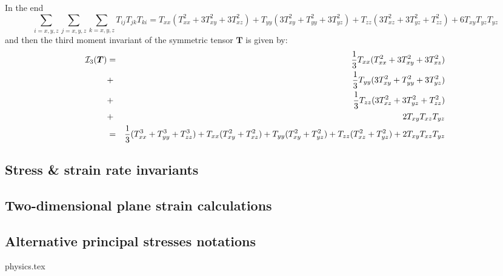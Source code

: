 In the end 
\[
\sum_{i=x,y,z} \sum_{j=x,y,z} \sum_{k=x,y,z}
T_{ij}T_{jk}T_{ki}
= T_{xx}( T_{xx}^2 + 3T_{xy}^2 + 3T_{xz}^2)
+ T_{yy}(3T_{xy}^2 +  T_{yy}^2 + 3T_{yz}^2   )
+ T_{zz}(3T_{xz}^2 + 3T_{yz}^2 + T_{zz}^2  )
+6T_{xy}T_{yz}T_{yz}
\]
and then the third moment invariant of the symmetric tensor ${\bm T}$
is given by:
\begin{eqnarray}
{\cal I}_3({\bm T}) 
&=& \frac{1}{3} T_{xx} (  T_{xx}^2 + 3 T_{xy}^2 + 3 T_{xz}^2  )     \nonumber\\
&+& \frac{1}{3} T_{yy} (3 T_{xy}^2 +   T_{yy}^2 + 3 T_{yz}^2  )     \nonumber\\
&+& \frac{1}{3} T_{zz} (3 T_{xz}^2 + 3 T_{yz}^2 +   T_{zz}^2)       \nonumber\\
&+& 2 T_{xy} T_{xz} T_{yz} \\
&=& \frac{1}{3} (T_{xx}^3+T_{yy}^3+T_{zz}^3) 
+T_{xx} ( T_{xy}^2 +  T_{xz}^2  ) 
+T_{yy} ( T_{xy}^2 +  T_{yz}^2  ) 
+T_{zz} ( T_{xz}^2 +  T_{yz}^2  ) + 2 T_{xy} T_{xz} T_{yz} 
\end{eqnarray}




\subsection{Stress \& strain rate invariants}\label{sec:stress_invariants}



\subsection{Two-dimensional plane strain calculations \label{ss:plane_strain}} 










\subsection{Alternative principal stresses notations}\label{sec:altinv}
\begin{flushright} {\tiny {\color{gray} physics.tex}} \end{flushright}

